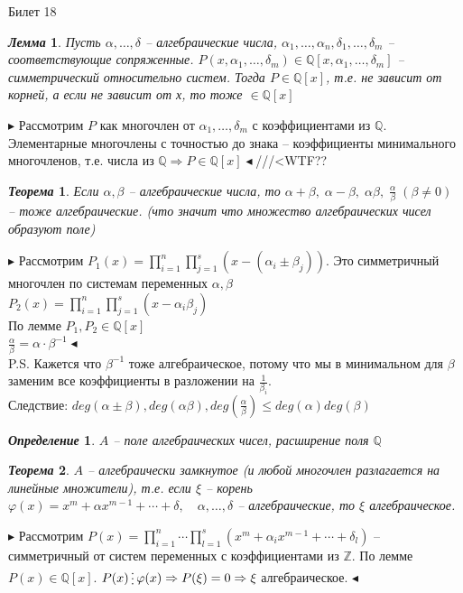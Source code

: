 \documentclass[a4paper,12pt]{article}
\newcommand{\divisible}{\mathop{\raisebox{-2pt}{\vdots}}}
\newtheorem{deff}{\textit{Определение}}
\newtheorem{teo}{\textit{Теорема}}
\newtheorem{lem}{\textit{Лемма}}
\newcommand{\FI}{\varphi}
\newcommand{\AL}{\alpha}
\newcommand{\q}{\quad}
\newcommand{\pb}{\blacktriangleright}
\newcommand{\pe}{\blacktriangleleft}
\newcommand{\Ra}{\Rightarrow}
\newcommand{\bb}[1]{\mathbb{#1}}
\begin{document}
\begin{mybox2}{{Билет 18}}
\begin{formbox}{}
\begin{lem} Пусть $\AL,\dots,\delta$ -- алгебраические числа, $\AL_1,\dots,\AL_n,\delta_1,\dots,\delta_m$ -- соответствующие сопряженные. $P(x,\AL_1,\dots, \delta_m)\in\bb{Q}[x,\AL_1,\dots, \delta_m]$ -- симметрический относительно систем. Тогда $P\in\bb{Q}[x]$, т.е. не зависит от корней, а если не зависит от х, то тоже  $\in\bb{Q}[x]$%
\end{lem}
\end{formbox}
$\pb$ Рассмотрим $P$ как многочлен от $\AL_1,\dots,\delta_m$ с коэффициентами из $\bb{Q}$. Элементарные многочлены с точностью до знака -- коэффициенты минимального многочленов, т.е. числа из $\bb{Q}\Ra P\in\bb{Q}[x]\pe $///<WTF??

\begin{formbox}{}
\begin{teo}
Если $\AL, \beta$ -- алгебраические числа, то $\AL+\beta, \; \AL-\beta,\; \AL\beta, \; \frac{\AL}{\beta}\; (\beta \not=0)$ -- тоже алгебраические. (что значит что множество алгебраических чисел образуют поле)
\end{teo}
\end{formbox}
$\pb$ Рассмотрим $P_1(x) = \prod\limits_{i=1}^n\prod\limits_{j=1}^s (x - (\AL_i \pm \beta_j)) $. Это симметричный многочлен по системам переменных $\AL, \beta$\\
$P_2(x) = \prod\limits_{i=1}^n\prod\limits_{j=1}^s (x - \AL_i\beta_j)$\\
По лемме $P_1, P_2\in\bb{Q}[x]$\\
$\frac{\AL}{\beta} = \AL\cdot \beta^{-1}\pe$\\P.S. Кажется что $\beta^{-1}$ тоже алгебраическое, потому что мы в минимальном для $\beta$ заменим все коэффициенты в разложении на $\frac{1}{\beta_i}$.\\
Следствие: $deg(\AL\pm\beta), deg(\AL\beta), deg(\frac{\AL}{\beta}) \le deg(\AL) deg(\beta) $


\begin{formbox}{}
\begin{deff} $A$ -- поле алгебраических чисел, расширение поля $\bb{Q}$
\end{deff}
\end{formbox}
\begin{formbox}{}

\begin{teo} $A$ -- алгебраически замкнутое (и любой многочлен разлагается на линейные множители), т.е. если $\xi$ -- корень $\FI(x) = x^m + \AL x^{m-1} + \cdots + \delta, \q\AL,\dots,\delta $ -- алгебраические, то $\xi$ алгебраическое.
\end{teo}
\end{formbox}
$\pb$ Рассмотрим $P(x) =\prod\limits_{i=1}^n\cdots\prod\limits_{l=1}^s (x^m + \AL_i x^{m-1} + \cdots + \delta_l)$ -- симметричный от систем переменных с коэффициентами из $\bb{Z}$. По лемме $P(x)\in\bb{Q}[x]$. $P(x)\divisible \FI(x) \Ra P(\xi) = 0 \Ra \xi$ алгебраическое. $\pe$

\end{mybox2}
\end{document}
